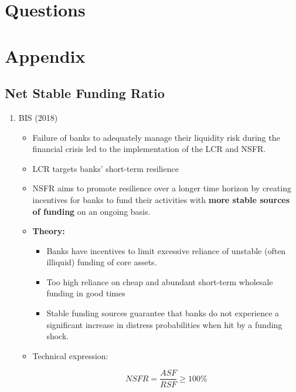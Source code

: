 \documentclass[a4paper,12pt]{article}
\begin{document}
\section{Questions}
\label{questions}


\clearpage

\section{Appendix}
\subsection{Net Stable Funding Ratio}

\begin{enumerate}
	\item BIS (2018)
		\begin{itemize}
			\item Failure of banks to adequately manage their liquidity risk during the financial crisis led to the implementation of the LCR and NSFR.

			\item LCR targets banks' short-term resilience

			\item NSFR aims to promote resilience over a longer time horizon by creating incentives for banks to fund their activities with \textbf{more stable sources of funding} on an ongoing basis.

			\item \textbf{Theory:}
			\begin{itemize}
				\item Banks have incentives to limit excessive reliance of unstable (often illiquid) funding of core assets. 

				\item Too high reliance on cheap and abundant short-term wholesale funding in good times

				\item Stable funding sources guarantee that banks do not experience a significant increase in distress probabilities when hit by a funding shock.
			\end{itemize}

			\item Technical expression:

			\begin{equation}
				NSFR = \frac{ASF}{RSF} \geq 100 \%
			\end{equation}


\end{itemize}
\end{enumerate}
\end{document}
